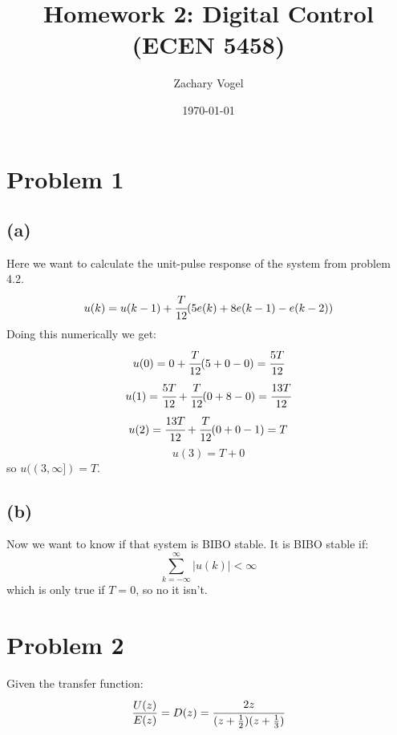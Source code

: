 \documentclass{article}
\title{Homework 2: Digital Control (ECEN 5458)}
\author{Zachary Vogel}
\date{\today}
\begin{document}
\maketitle

\section*{Problem 1}
\subsection*{(a)}
Here we want to calculate the unit-pulse response of the system from problem 4.2.
\[u(k)=u(k-1)+\cfrac{T}{12}(5e(k)+8e(k-1)-e(k-2))\]
Doing this numerically we get:
\[u(0)=0+\cfrac{T}{12}(5+0-0)=\cfrac{5T}{12}\]
\[u(1)=\cfrac{5T}{12}+\cfrac{T}{12}(0+8-0)=\cfrac{13T}{12}\]
\[u(2)=\cfrac{13T}{12}+\cfrac{T}{12}(0+0-1)=T\]
\[u(3)=T+0\]
so $u((3,\infty])=T$.
\subsection*{(b)}
Now we want to know if that system is BIBO stable. It is BIBO stable if:
\[\sum_{k=-\infty}^\infty\lvert u(k)\rvert <\infty\]
which is only true if $T=0$, so no it isn't.

\section*{Problem 2}
Given the transfer function:
\[\frac{U(z)}{E(z)}=D(z)=\cfrac{2z}{(z+\frac{1}{2})(z+\frac{1}{3})}\]
\end{document}
